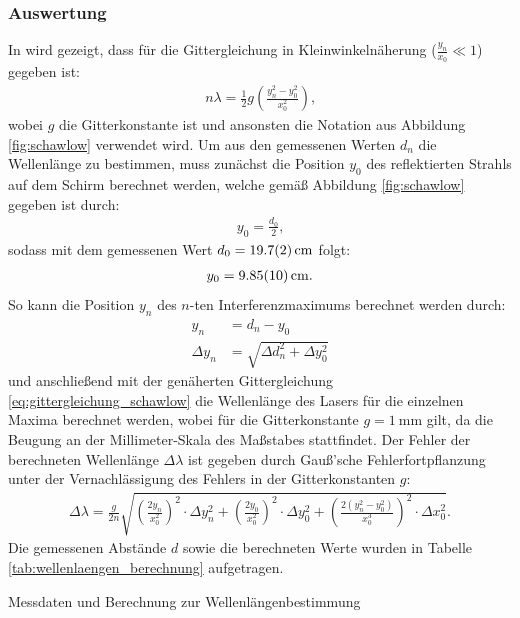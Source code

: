 \documentclass[11pt, a4paper]{article}
\numberwithin{equation}{section}
\begin{document}
\subsubsection{Auswertung}
In \cite{schawlow} wird gezeigt, dass für die Gittergleichung in Kleinwinkelnäherung ($\frac{y_n}{x_0} \ll 1$) gegeben ist:
\begin{align}
	n \lambda = \frac{1}{2} g \left( \frac{y_n^2 - y_0^2}{x_0^2} \right) \text{,}
	\label{eq:gittergleichung_schawlow}
\end{align}
wobei $g$ die Gitterkonstante ist und ansonsten die Notation aus Abbildung \ref{fig:schawlow} verwendet wird.
Um aus den gemessenen Werten $d_n$ die Wellenlänge zu bestimmen, muss zunächst die Position $y_0$ des reflektierten Strahls auf dem Schirm berechnet werden, welche gemäß Abbildung \ref{fig:schawlow} gegeben ist durch:
\begin{align}
	y_0 = \frac{d_0}{2} \text{,}
\end{align}
sodass mit dem gemessenen Wert $d_0 = \SI{19.7 +- 0.2}{\centi\metre}$ folgt:
\begin{align}
	y_0 = \SI{9.85 +- 0.10}{\centi\metre} \text{.}
\end{align}
So kann die Position $y_n$ des $n$-ten Interferenzmaximums berechnet werden durch:
\begin{align}
	y_n &= d_n - y_0 \\
	\Delta y_n &= \sqrt{\Delta d_n^2 + \Delta y_0^2}
\end{align}
und anschließend mit der genäherten Gittergleichung \ref{eq:gittergleichung_schawlow} die Wellenlänge des Lasers für die einzelnen Maxima berechnet werden, wobei für die Gitterkonstante $g = \SI{1}{\milli\metre}$ gilt, da die Beugung an der Millimeter-Skala des Maßstabes stattfindet. 
Der Fehler der berechneten Wellenlänge $\Delta \lambda$ ist gegeben durch Gauß'sche Fehlerfortpflanzung unter der Vernachlässigung des Fehlers in der Gitterkonstanten $g$:
\begin{align}
	\Delta \lambda = \frac{g}{2 n} \sqrt{\left( \frac{2 y_n}{x_0^2} \right)^2 \cdot \Delta y_n^2 + \left( \frac{2 y_0}{x_0^2} \right)^2 \cdot \Delta y_0^2 + \left(\frac{2\left(y_n^2 - y_0^2 \right)}{x_0^3}\right)^2 \cdot \Delta x_0^2} \text{.}
\end{align}
Die gemessenen Abstände $d$ sowie die berechneten Werte wurden in Tabelle \ref{tab:wellenlaengen_berechnung} aufgetragen.
\begin{table}[h]
	\centering
	
	\caption{Messdaten und Berechnung zur Wellenlängenbestimmung}
	\label{tab:wellenlaengen_berechnung}
\end{table}
\end{document}

